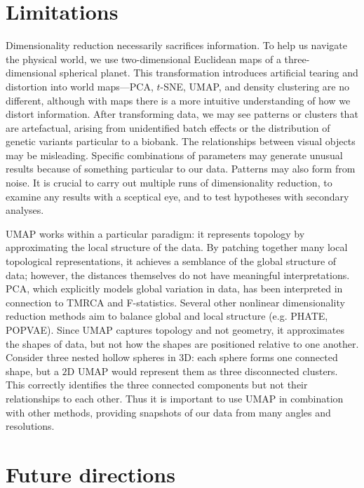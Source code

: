 \section{Limitations}

Dimensionality reduction necessarily sacrifices information. To help us navigate the physical world, we use two-dimensional Euclidean maps of a three-dimensional spherical planet. This transformation introduces artificial tearing and distortion into world maps---PCA, $t$-SNE, UMAP, and density clustering are no different, although with maps there is a more intuitive understanding of how we distort information. After transforming data, we may see patterns or clusters that are artefactual, arising from unidentified batch effects or the distribution of genetic variants particular to a biobank. The relationships between visual objects may be misleading. Specific combinations of parameters may generate unusual results because of something particular to our data. Patterns may also form from noise. It is crucial to carry out multiple runs of dimensionality reduction, to examine any results with a sceptical eye, and to test hypotheses with secondary analyses.

UMAP works within a particular paradigm: it represents topology by approximating the local structure of the data. By patching together many local topological representations, it achieves a semblance of the global structure of data; however, the distances themselves do not have meaningful interpretations. PCA, which explicitly models global variation in data, has been interpreted in connection to TMRCA and F-statistics\citep{mcvean2009genealogical,peter_geometric_2022}. Several other nonlinear dimensionality reduction methods aim to balance global and local structure (e.g. PHATE\citep{moon2019visualizing}, POPVAE\citep{battey_visualizing_2021}). Since UMAP captures topology and not geometry, it approximates the shapes of data, but not how the shapes are positioned relative to one another. Consider three nested hollow spheres in $3$D: each sphere forms one connected shape, but a $2$D UMAP would represent them as three disconnected clusters\citep{herrmann_enhancing_2022}. This correctly identifies the three connected components but not their relationships to each other. Thus it is important to use UMAP in combination with other methods, providing snapshots of our data from many angles and resolutions.

\section{Future directions}

